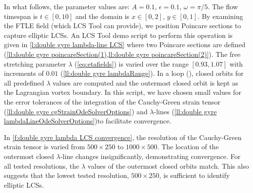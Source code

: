 \documentclass{elsarticle}
\begin{document}
In what follows, the parameter values are: $A = 0.1$, $\epsilon = 0.1$, $\omega = \pi/5$. The flow timespan is $t \in [0,10]$ and the domain is $x \in [0,2]$, $y \in [0,1]$. By examining the FTLE field (which LCS Tool can provide), we position Poincare sections to capture elliptic LCSs. An LCS Tool demo script to perform this operation is given in \cref{l:double gyre lambda-line LCS} where two Poincare sections are defined (\cref{ll:double gyre poincareSection(1),ll:double gyre poincareSection(2)}). The free stretching parameter $\lambda$ (\cref{eq:etafields}) is varied over the range $[0.93,1.07]$ with increments of $0.01$ (\cref{ll:double gyre lambdaRange}).
In a loop (), closed orbits for all predefined $\lambda$ values are computed and the outermost closed orbit is kept as the Lagrangian vortex boundary.
In this script, we have chosen small values for the error tolerances of the integration of the Cauchy-Green strain tensor (\cref{ll:double gyre cgStrainOdeSolverOptions}) and $\lambda$-lines (\cref{ll:double gyre lambdaLineOdeSolverOptions})to facilitate convergence.



In \cref{f:double gyre lambda LCS convergence}, the resolution of the  Cauchy-Green strain tensor is varied from $500 \times 250$ to $1000 \times 500$. The location of the outermost closed $\lambda$-line changes insignificantly, demonstrating convergence. For all tested resolutions, the $\lambda$ values of the outermost closed orbits match.
This also suggests that the lowest tested resolution, $500 \times 250$, is sufficient to identify elliptic LCSs.
\end{document}
